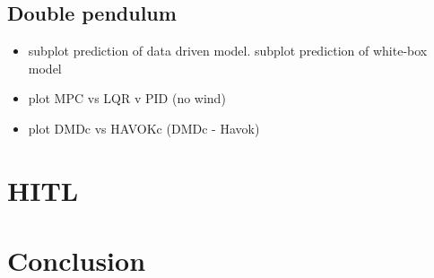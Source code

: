         \FloatBarrier\subsection{Double pendulum}

            \begin{itemize}
                \item subplot prediction of data driven model. subplot prediction of white-box model
                \item plot \gls{MPC} vs \gls{LQR} v \gls{PID} (no wind)
                \item plot \gls{DMDc} vs \gls{HAVOKc} (\gls{DMDc} - Havok)
            \end{itemize}

    \section{HITL}

    \section{Conclusion}


